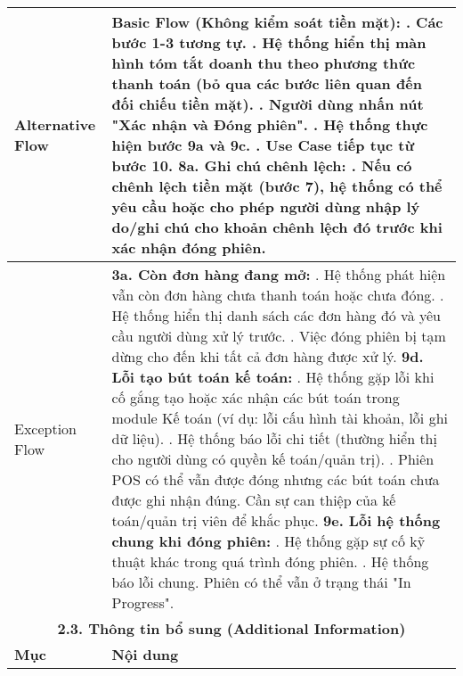 \begin{longtable}{|m{4cm}|p{11cm}|}
Alternative Flow & \textbf{Basic Flow (Không kiểm soát tiền mặt):} \newline    1. Các bước 1-3 tương tự. \newline    2. Hệ thống hiển thị màn hình tóm tắt doanh thu theo phương thức thanh toán (bỏ qua các bước liên quan đến đối chiếu tiền mặt). \newline    3. Người dùng nhấn nút "Xác nhận và Đóng phiên". \newline    4. Hệ thống thực hiện bước 9a và 9c. \newline    5. Use Case tiếp tục từ bước 10. \newline \textbf{8a. Ghi chú chênh lệch:} \newline    1. Nếu có chênh lệch tiền mặt (bước 7), hệ thống có thể yêu cầu hoặc cho phép người dùng nhập lý do/ghi chú cho khoản chênh lệch đó trước khi xác nhận đóng phiên. \\
\hline
Exception Flow & \textbf{3a. Còn đơn hàng đang mở:} \newline    1. Hệ thống phát hiện vẫn còn đơn hàng chưa thanh toán hoặc chưa đóng. \newline    2. Hệ thống hiển thị danh sách các đơn hàng đó và yêu cầu người dùng xử lý trước. \newline    3. Việc đóng phiên bị tạm dừng cho đến khi tất cả đơn hàng được xử lý. \newline \textbf{9d. Lỗi tạo bút toán kế toán:} \newline    1. Hệ thống gặp lỗi khi cố gắng tạo hoặc xác nhận các bút toán trong module Kế toán (ví dụ: lỗi cấu hình tài khoản, lỗi ghi dữ liệu). \newline    2. Hệ thống báo lỗi chi tiết (thường hiển thị cho người dùng có quyền kế toán/quản trị). \newline    3. Phiên POS có thể vẫn được đóng nhưng các bút toán chưa được ghi nhận đúng. Cần sự can thiệp của kế toán/quản trị viên để khắc phục. \newline \textbf{9e. Lỗi hệ thống chung khi đóng phiên:} \newline    1. Hệ thống gặp sự cố kỹ thuật khác trong quá trình đóng phiên. \newline    2. Hệ thống báo lỗi chung. Phiên có thể vẫn ở trạng thái "In Progress". \\
\hline
\multicolumn{2}{|c|}{\textbf{2.3. Thông tin bổ sung (Additional Information)}} \\
\hline
\textbf{Mục} & \textbf{Nội dung} \\
\hline

\end{longtable}
